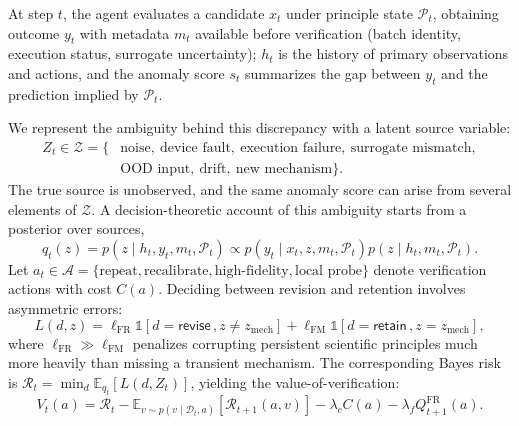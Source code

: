 \documentclass{article}
\newcommand{\revise}{\mathsf{revise}\,}
\newcommand{\retain}{\mathsf{retain}\,}
\begin{document}
At step $t$, the agent evaluates a candidate $x_t$ under principle state $\mathcal{P}_t$, obtaining outcome $y_t$ with metadata $m_t$ available before verification (batch identity, execution status, surrogate uncertainty); $h_t$ is the history of primary observations and actions, and the anomaly score $s_t$ summarizes the gap between $y_t$ and the prediction implied by $\mathcal{P}_t$.

We represent the ambiguity behind this discrepancy with a latent source variable:
\begin{equation}
\begin{split}
  Z_t \in \mathcal{Z} = \{ &\text{noise},\ \text{device fault},\ \text{execution failure},\ \text{surrogate mismatch},\\
  &\text{OOD input},\ \text{drift},\ \text{new mechanism}\}.
\end{split}
  \label{eq:sources}
\end{equation}
The true source is unobserved, and the same anomaly score can arise from several elements of $\mathcal{Z}$. A decision-theoretic account of this ambiguity starts from a posterior over sources,
\begin{equation}
 q_t(z) = p(z \mid h_t,y_t,m_t,\mathcal{P}_t) \propto p(y_t \mid x_t,z,m_t,\mathcal{P}_t) p(z \mid h_t,m_t,\mathcal{P}_t).
 \label{eq:posterior}
\end{equation}
Let $a_t\in\mathcal{A}=\{\text{repeat},\text{recalibrate},\text{high-fidelity},\text{local probe}\}$ denote verification actions with cost $C(a)$. Deciding between revision and retention involves asymmetric errors:
\begin{equation}
 L(d,z)=\ell_{\mathrm{FR}}\mathbb{1}[d=\revise,z\neq z_{\mathrm{mech}}] + \ell_{\mathrm{FM}}\mathbb{1}[d=\retain,z=z_{\mathrm{mech}}],
 \label{eq:loss}
\end{equation}
where $\ell_{\mathrm{FR}} \gg \ell_{\mathrm{FM}}$ penalizes corrupting persistent scientific principles much more heavily than missing a transient mechanism. The corresponding Bayes risk is $\mathcal{R}_t=\min_d\mathbb{E}_{q_t}[L(d,Z_t)]$, yielding the value-of-verification:
\begin{equation}
 V_t(a) = \mathcal{R}_t - \mathbb{E}_{v\sim p(v\mid\mathcal{D}_t,a)}[\mathcal{R}_{t+1}(a,v)] - \lambda_c C(a) - \lambda_f Q_{t+1}^{\mathrm{FR}}(a).
 \label{eq:utility}
\end{equation}
\end{document}
